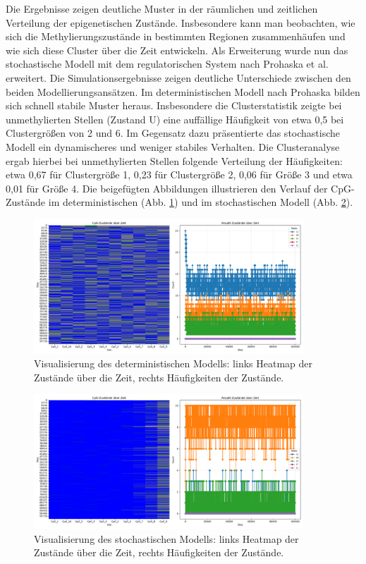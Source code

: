 \documentclass{SeminarV2}
\begin{document}
Die Ergebnisse zeigen deutliche Muster in der r\"{a}umlichen und zeitlichen 
Verteilung der epigenetischen Zust\"{a}nde. Insbesondere kann man beobachten, wie sich die Methylierungszust\"{a}nde in bestimmten Regionen zusammenh\"{a}ufen und wie sich diese Cluster \"{u}ber die Zeit entwickeln.
Als Erweiterung wurde nun das stochastische Modell mit dem regulatorischen System nach Prohaska et al. erweitert.
Die Simulationsergebnisse zeigen deutliche Unterschiede zwischen den beiden Modellierungsansätzen. Im deterministischen Modell nach Prohaska bilden sich schnell stabile Muster heraus. Insbesondere die Clusterstatistik zeigte bei unmethylierten Stellen (Zustand U) eine auffällige Häufigkeit von etwa 0,5 bei Clustergrößen von 2 und 6.
Im Gegensatz dazu präsentierte das stochastische Modell ein dynamischeres und weniger stabiles Verhalten. Die Clusteranalyse ergab hierbei bei unmethylierten Stellen folgende Verteilung der Häufigkeiten: etwa 0,67 für Clustergröße 1, 0,23 für Clustergröße 2, 0,06 für Größe 3 und etwa 0,01 für Größe 4.
Die beigefügten Abbildungen illustrieren den Verlauf der CpG-Zustände im deterministischen (Abb. \ref{fig:cpg_states_det}) und im stochastischen Modell (Abb. \ref{fig:cpg_states_stoch}).

\begin{figure}[htbp]
\centering
\includegraphics[width=0.9\textwidth]{images/cpg_states_plot_det.png}
\caption{Visualisierung des deterministischen Modells: links Heatmap der Zustände über die Zeit, rechts Häufigkeiten der Zustände.}
\label{fig:cpg_states_det}
\end{figure}

\begin{figure}[htbp]
\centering
\includegraphics[width=0.9\textwidth]{images/cpg_states_plot_stoch.png}
\caption{Visualisierung des stochastischen Modells: links Heatmap der Zustände über die Zeit, rechts Häufigkeiten der Zustände.}
\label{fig:cpg_states_stoch}
\end{figure}
\end{document}
